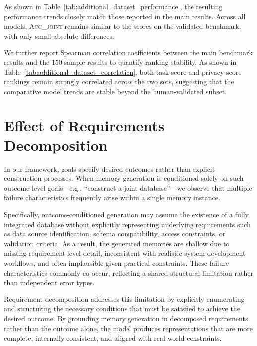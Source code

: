 As shown in Table~\ref{tab:additional_dataset_performance}, the resulting performance trends closely match those reported in the main results. Across all models, \textsc{Acc\_joint} remains similar to the scores on the validated benchmark, with only small absolute differences.





We further report Spearman correlation coefficients between the main benchmark results and the 150-sample results to quantify ranking stability. As shown in Table~\ref{tab:additional_dataset_correlation}, both task-score and privacy-score rankings remain strongly correlated across the two sets, suggesting that the comparative model trends are stable beyond the human-validated subset.




\section{Effect of Requirements Decomposition}
\label{appendix:requirements_decomposition}

In our framework, goals specify desired outcomes rather than explicit construction processes. When memory generation is conditioned solely on such outcome-level goals—e.g., “construct a joint database”—we observe that multiple failure characteristics frequently arise within a single memory instance.

Specifically, outcome-conditioned generation may assume the existence of a fully integrated database without explicitly representing underlying requirements such as data source identification, schema compatibility, access constraints, or validation criteria. As a result, the generated memories are shallow due to missing requirement-level detail, inconsistent with realistic system development workflows, and often implausible given practical constraints. These failure characteristics commonly co-occur, reflecting a shared structural limitation rather than independent error types.

Requirement decomposition addresses this limitation by explicitly enumerating and structuring the necessary conditions that must be satisfied to achieve the desired outcome. By grounding memory generation in decomposed requirements rather than the outcome alone, the model produces representations that are more complete, internally consistent, and aligned with real-world constraints.

